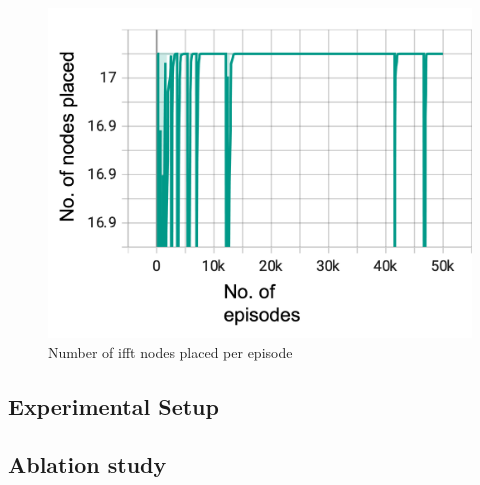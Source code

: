   \begin{figure}[h]
    \centering
    \includegraphics[width=\linewidth]{fig/ifft_nodes_placed.png}
    \caption{Number of ifft nodes placed per episode}
    \label{fig:ifft_rewards}
  \end{figure}

\subsection{Experimental Setup}

\subsection{Ablation study}